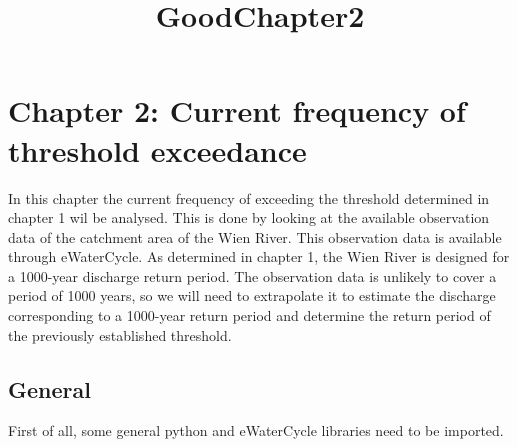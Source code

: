 \documentclass[11pt]{article}
\title{GoodChapter2}
\begin{document}
    
    \maketitle
    
    

    
    \section{Chapter 2: Current frequency of threshold
exceedance}\label{chapter-2-current-frequency-of-threshold-exceedance}

    In this chapter the current frequency of exceeding the threshold
determined in chapter 1 wil be analysed. This is done by looking at the
available observation data of the catchment area of the Wien River. This
observation data is available through eWaterCycle. As determined in
chapter 1, the Wien River is designed for a 1000-year discharge return
period. The observation data is unlikely to cover a period of 1000
years, so we will need to extrapolate it to estimate the discharge
corresponding to a 1000-year return period and determine the return
period of the previously established threshold.

    \subsection{General}\label{general}

    First of all, some general python and eWaterCycle libraries need to be
imported.
\end{document}
